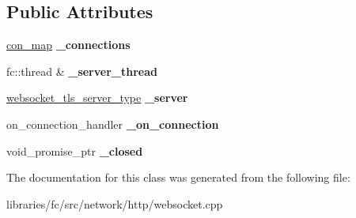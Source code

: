\subsection*{Public Attributes}
\begin{DoxyCompactItemize}
\item 
\mbox{\label{classfc_1_1http_1_1detail_1_1websocket__tls__server__impl_a586e78cb3dd377d33fc9d3a3deaf8859}} 
\mbox{\hyperlink{classstd_1_1map}{con\+\_\+map}} {\bfseries \+\_\+connections}
\item 
\mbox{\label{classfc_1_1http_1_1detail_1_1websocket__tls__server__impl_a72298298a3ba0b817e94c2a6e0852669}} 
fc\+::thread \& {\bfseries \+\_\+server\+\_\+thread}
\item 
\mbox{\label{classfc_1_1http_1_1detail_1_1websocket__tls__server__impl_ac690d7baf1279c4e0ff8b4c5bd7772e6}} 
\mbox{\hyperlink{classwebsocketpp_1_1server}{websocket\+\_\+tls\+\_\+server\+\_\+type}} {\bfseries \+\_\+server}
\item 
\mbox{\label{classfc_1_1http_1_1detail_1_1websocket__tls__server__impl_a2f8c138692ff3cc21320c3e337842fd0}} 
on\+\_\+connection\+\_\+handler {\bfseries \+\_\+on\+\_\+connection}
\item 
\mbox{\label{classfc_1_1http_1_1detail_1_1websocket__tls__server__impl_ab52488e06d034bec64e558c0ed8c28f7}} 
void\+\_\+promise\+\_\+ptr {\bfseries \+\_\+closed}
\end{DoxyCompactItemize}


The documentation for this class was generated from the following file\+:\begin{DoxyCompactItemize}
\item 
libraries/fc/src/network/http/websocket.\+cpp\end{DoxyCompactItemize}
